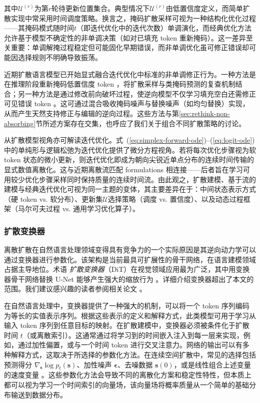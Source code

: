 \documentclass[UTF8,a4paper,zihao=-4,oneside,openany]{ctexbook}
\begin{document}
\noindent 其中$\mathcal{U}^{(r)}$为第$r$轮待更新位置集合。典型情况下$\mathcal{U}^{(r)}$由低置信度定义，而简单扩散实现中常采用时间调度策略。换言之，掩码扩散采样可视为一种结构化优化过程——其掩码模式随时间$t$（即迭代优化中的迭代次数）单调演化，而经典优化方法允许基于模型不确定性的非单调决策（如对已填充 token 重新掩码）。这一差异至关重要：单调解掩过程稳定但可能固化早期错误，而非单调优化虽可修正错误却可能因选择规则不明确导致振荡。

近期扩散语言模型已开始显式融合迭代优化中标准的非单调修正行为。一种方法是在推理阶段重新掩码低置信度 token ，将扩散采样与类掩码预测的复查机制结合\citep{koh-etal:2025conditional,zhang-etal:2025corrective}；另一种方法是通过修改前向破坏过程，使逆向模型不仅学习填充空白还需修正可见错误 token 。这可通过混合吸收掩码噪声与替换噪声（如均匀替换）实现，从而产生天然支持修正与编辑的逆向过程\citep{rutte-etal:2025generalized}。这些方法与第\ref{sec:rethink-non-absorbing}节所述方案存在交集，也呼应了我们关于组合不同扩散策略的讨论。

从扩散模型视角亦可解读迭代优化。式~(\ref{eq:simplex-forward-ode})--(\ref{eq:logit-ode})中的单纯形与逻辑松弛为迭代优化提供了微分方程视角。若将每次优化步骤视为软 token 状态的微小更新，则迭代优化即成为朝向尖锐近单点分布的连续时间传输的显式数值离散化。这与近期离散流匹配 formulations 相连接——后者旨在学习可用较少优化步骤采样同时保持质量的连续时间流\citep{gat-etal:2024discrete,monsefi-etal:2025fs}。由此观之，扩散建模、基于流的建模与经典迭代优化可视为同一主题的变体，其主要差异在于：中间状态表示方式（硬 token vs. 软分布）、更新集$\mathcal{U}$选择策略（调度 vs. 置信度）、以及动态过程框架（马尔可夫过程 vs. 通用学习优化算子）。
\subsubsection{扩散变换器}

离散扩散在自然语言处理领域变得具有竞争力的一个实际原因是其逆向动力学可以通过变换器进行参数化。该架构是当前最具可扩展性的骨干网络，在语言建模领域占据主导地位。术语 \textit{扩散变换器}（DiT）在视觉领域应用最为广泛，其中用变换器骨干网络替换 U-Net 能够产生强大的缩放行为 \citep{peebles-and-xie:2023scalable}。详细介绍变换器超出了本文的范围。我们建议感兴趣的读者参阅相关论文 \citep{vaswani-etal:2017attention,xiao-and-zhu:2023introduction}。

在自然语言处理中，变换器提供了一种强大的机制，可以将一个 token 序列编码为等长的实值表示序列。根据这些表示的定义和解释方式，此类模型可用于学习从输入 token 序列到任意目标的映射。在扩散建模中，变换器必须被条件化于扩散时间 $t$（或离散索引）。这通常通过将学习到的时间嵌入注入到每一层来实现，例如，通过加性偏置，或与一个时间 token 进行交叉注意力。网络的输出可以有多种解释方式，这取决于所选择的参数化方法。在连续空间扩散中，常见的选择包括预测得分 $\nabla_{\mathbf{s}} \log p_t(\mathbf{s})$、加性噪声 $\boldsymbol{\epsilon}$、去噪数据 $\mathbf{s}(0)$，或是线性组合上述变量的速度变量 \citep{ho-eatl:2020denoising,salimans-and-ho:2022progressive}。这些参数化方法会导致不同的离散化方案和稳定性特性，但本质上都可以视为学习一个时间索引的向量场，该向量场将概率质量从一个简单的基础分布输送到数据分布。
\end{document}
